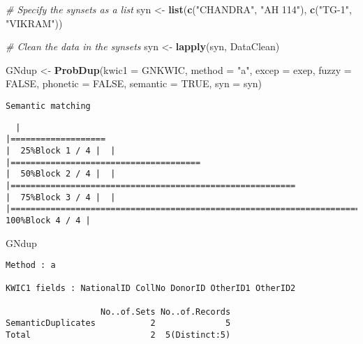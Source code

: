 \documentclass[
]{article}
\newenvironment{Shaded}{\begin{snugshade}}{\end{snugshade}}
\newcommand{\CommentTok}[1]{\textcolor[rgb]{0.56,0.35,0.01}{\textit{#1}}}
\newcommand{\DataTypeTok}[1]{\textcolor[rgb]{0.13,0.29,0.53}{#1}}
\newcommand{\KeywordTok}[1]{\textcolor[rgb]{0.13,0.29,0.53}{\textbf{#1}}}
\newcommand{\NormalTok}[1]{#1}
\newcommand{\OtherTok}[1]{\textcolor[rgb]{0.56,0.35,0.01}{#1}}
\newcommand{\StringTok}[1]{\textcolor[rgb]{0.31,0.60,0.02}{#1}}
\begin{document}
\begin{Shaded}
\begin{Highlighting}[]
\CommentTok{# Specify the synsets as a list}
\NormalTok{syn <-}\StringTok{ }\KeywordTok{list}\NormalTok{(}\KeywordTok{c}\NormalTok{(}\StringTok{"CHANDRA"}\NormalTok{, }\StringTok{"AH 114"}\NormalTok{), }\KeywordTok{c}\NormalTok{(}\StringTok{"TG-1"}\NormalTok{, }\StringTok{"VIKRAM"}\NormalTok{))}

\CommentTok{# Clean the data in the synsets}
\NormalTok{syn <-}\StringTok{ }\KeywordTok{lapply}\NormalTok{(syn, DataClean)}

\NormalTok{GNdup <-}\StringTok{ }\KeywordTok{ProbDup}\NormalTok{(}\DataTypeTok{kwic1 =}\NormalTok{ GNKWIC, }\DataTypeTok{method =} \StringTok{"a"}\NormalTok{, }\DataTypeTok{excep =}\NormalTok{ exep, }
                 \DataTypeTok{fuzzy =} \OtherTok{FALSE}\NormalTok{, }\DataTypeTok{phonetic =} \OtherTok{FALSE}\NormalTok{,}
                 \DataTypeTok{semantic =} \OtherTok{TRUE}\NormalTok{, }\DataTypeTok{syn =}\NormalTok{ syn)}
\end{Highlighting}
\end{Shaded}

\begin{verbatim}
Semantic matching
\end{verbatim}

\begin{verbatim}
  |                                                                                    |===================                                                         |  25%Block 1 / 4 |  |                                                                                    |======================================                                      |  50%Block 2 / 4 |  |                                                                                    |=========================================================                   |  75%Block 3 / 4 |  |                                                                                    |============================================================================| 100%Block 4 / 4 |
\end{verbatim}

\begin{Shaded}
\begin{Highlighting}[]
\NormalTok{GNdup}
\end{Highlighting}
\end{Shaded}

\begin{verbatim}
Method : a

KWIC1 fields : NationalID CollNo DonorID OtherID1 OtherID2
 
                   No..of.Sets No..of.Records
SemanticDuplicates           2              5
Total                        2  5(Distinct:5)
\end{verbatim}
\end{document}
